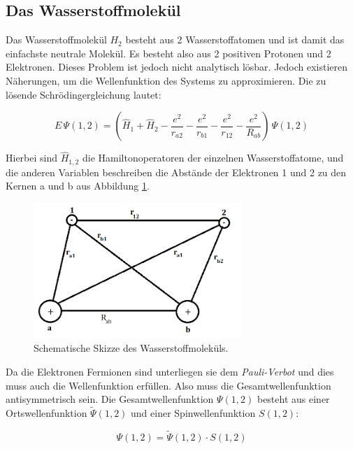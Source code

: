 \subsection{Das Wasserstoffmolekül}
\label{sec:H2}

Das Wasserstoffmolekül $H_2$ besteht aus 2 Wasserstoffatomen und ist damit das einfachste neutrale Molekül. Es besteht also aus 2 positiven Protonen und 2 Elektronen. Dieses Problem ist jedoch nicht analytisch lösbar. Jedoch existieren Näherungen, um die Wellenfunktion des Systems zu approximieren. Die zu lösende Schrödingergleichung lautet:

\begin{equation}
    E \, \Psi (1, 2) = \left( \hat{H}_1 + \hat{H}_2 - \frac{e^2}{r_{a2}} - \frac{e^2}{r_{b1}} - \frac{e^2}{r_{12}} - \frac{e^2}{R_{ab}} \right) \, \Psi (1, 2)
    \label{eqn:H2}
\end{equation}

Hierbei sind $\hat{H}_{1,2}$ die Hamiltonoperatoren der einzelnen Wasserstoffatome, und die anderen Variablen beschreiben die Abstände der Elektronen 1 und 2 zu den Kernen a und b aus Abbildung \ref{fig:H2}.

\begin{figure}[H]
    \centering
    \includegraphics[width=0.7\textwidth]{build/H2.PNG}
    \caption{Schematische Skizze des Wasserstoffmoleküls.}
    \label{fig:H2}
\end{figure}

Da die Elektronen Fermionen sind unterliegen sie dem \textit{Pauli-Verbot} und dies muss auch die Wellenfunktion erfüllen. Also muss die Gesamtwellenfunktion antisymmetrisch sein. Die Gesamtwellenfunktion $\Psi (1,2)$ besteht aus einer Ortswellenfunktion $\tilde{\Psi} (1,2)$ und einer Spinwellenfunktion $S (1,2)$:

\begin{equation}
    \Psi (1,2) = \tilde{\Psi} (1,2) \cdot S (1,2)
    \label{eqn:gesamt}
\end{equation}


